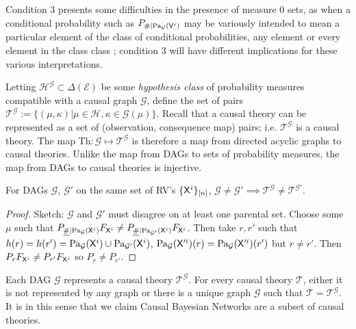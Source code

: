 Condition 3 presents some difficulties in the presence of measure 0 sets, as when a conditional probability such as $P_{\#|\text{Pa}_{\mathcal{G}}(\mathsf{V}^i)}$ may be variously intended to mean a particular element of the class of conditional probabilities, any element or every element in the class class \citep{cinlar_probability_2011}; condition 3 will have different implications for these various interpretations. 

Letting $\mathscr{H}^{\mathcal{G}}\subset\Delta(\mathcal{E})$ be some \emph{hypothesis class} of probability measures compatible with a causal graph $\mathcal{G}$, define the set of pairs $\mathscr{T}^{\mathcal{G}}:= \{(\mu,\kappa)|\mu\in \mathscr{H}, \kappa\in \mathcal{G}(\mu)\}$. Recall that a causal theory can be represented as a set of (observation, consequence map) pairs; i.e. $\mathscr{T}^{\mathcal{G}}$ is a causal theory. The map $\mathrm{Th}:\mathcal{G}\mapsto \mathscr{T}^{\mathcal{G}}$ is therefore a map from directed acyclic graphs to causal theories. Unlike the map from DAGs to sets of probability measures, the map from DAGs to causal theories is injective.

\begin{theorem}
For DAGs $\mathcal{G}$, $\mathcal{G}'$ on the same set of RV's $\{\mathsf{X}^i\}_{[n]}$, $\mathcal{G}\neq \mathcal{G}'\implies \mathscr{T}^{\mathcal{G}}\neq \mathscr{T}^{\mathcal{G}'}$.
\end{theorem}

\begin{proof}
Sketch: $\mathcal{G}$ and $\mathcal{G}'$ must disagree on at least one parental set. Choose some $\mu$ such that $P_{\underline{\#}|\text{Pa}_{\mathcal{G}}(\mathsf{X}^i)}F_{\mathsf{X}^i} \neq  P_{\underline{\#}|\text{Pa}_{\mathcal{G}'}(\mathsf{X}^i)}F_{\mathsf{X}^i}$. Then take $r,r'$ such that $h(r) = h(r') = \text{Pa}_{\mathcal{G}}(\mathsf{X}^i)\cup \text{Pa}_{\mathcal{G}'}(\mathsf{X}^i)$, $\text{Pa}_{\mathcal{G}}(\mathsf{X}'^i)(r) = \text{Pa}_{\mathcal{G}}(\mathsf{X}'^i)(r')$ but $r\neq r'$. Then $P_r F_{\mathsf{X}^i} \neq P_{r'} F_{\mathsf{X}^i}$ so $P_r\neq P_{r'}$.
\end{proof}

Each DAG $\mathcal{G}$ represents a causal theory $\mathscr{T}^\mathcal{G}$. For every causal theory $\mathscr{T}$, either it is not represented by any graph or there is a unique graph $\mathcal{G}$ such that $\mathscr{T}=\mathscr{T}^\mathcal{G}$. It is in this sense that we claim Causal Bayesian Networks are a subset of causal theories.